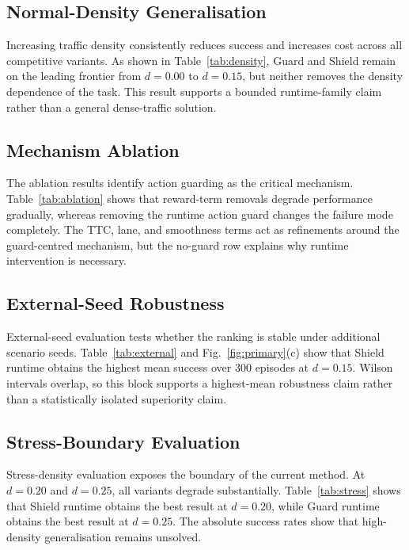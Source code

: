 \documentclass[conference,a4paper]{IEEEtran}
\begin{document}
\subsection{Normal-Density Generalisation}
Increasing traffic density consistently reduces success and increases cost across all competitive variants. As shown in Table~\ref{tab:density}, Guard and Shield remain on the leading frontier from $d=0.00$ to $d=0.15$, but neither removes the density dependence of the task. This result supports a bounded runtime-family claim rather than a general dense-traffic solution.


\subsection{Mechanism Ablation}
The ablation results identify action guarding as the critical mechanism. Table~\ref{tab:ablation} shows that reward-term removals degrade performance gradually, whereas removing the runtime action guard changes the failure mode completely. The TTC, lane, and smoothness terms act as refinements around the guard-centred mechanism, but the no-guard row explains why runtime intervention is necessary.


\subsection{External-Seed Robustness}
External-seed evaluation tests whether the ranking is stable under additional scenario seeds. Table~\ref{tab:external} and Fig.~\ref{fig:primary}(c) show that Shield runtime obtains the highest mean success over 300 episodes at $d=0.15$. Wilson intervals overlap, so this block supports a highest-mean robustness claim rather than a statistically isolated superiority claim.


\subsection{Stress-Boundary Evaluation}
Stress-density evaluation exposes the boundary of the current method. At $d=0.20$ and $d=0.25$, all variants degrade substantially. Table~\ref{tab:stress} shows that Shield runtime obtains the best result at $d=0.20$, while Guard runtime obtains the best result at $d=0.25$. The absolute success rates show that high-density generalisation remains unsolved.

\end{document}
